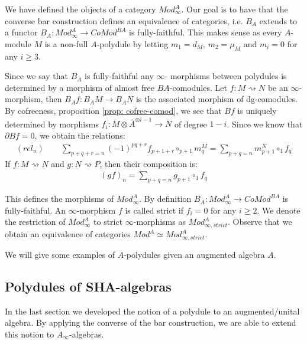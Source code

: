 \documentclass[../thesis.tex]{subfiles}
\begin{document}
            We have defined the objects of a category $Mod_\infty^A$. Our goal is to have that the converse bar construction defines an equivalence of categories, i.e. $B_A$ extends to a functor $B_A : Mod_\infty^A \rightarrow CoMod^{BA}$ is fully-faithful. This makes sense as every $A$-module $M$ is a non-full $A$-polydule by letting $m_1 = d_M$, $m_2 = \mu_M$ and $m_i = 0$ for any $i\geq 3$.

            Since we say that $B_A$ is fully-faithful any $\infty$- morphisms between polydules is determined by a morphism of almost free $BA$-comodules. Let $f : M \rightsquigarrow N$ be an $\infty$-morphism, then $B_Af : B_AM \rightarrow B_AN$ is the associated morphism of dg-comodules. By cofreeness, proposition \ref{prop: cofree-comod}, we see that $Bf$ is uniquely determined by morphisms $f_i : M \otimes \bar{A}^{\otimes i-1} \rightarrow N$ of degree $1-i$. Since we know that $\partial Bf = 0$, we obtain the relations:
            \begin{align*}
                (rel_n)\qquad \sum_{p+q+r = n} (-1)^{pq+r}f_{p+1+r} \circ_{p+1} m^M_{q} = \sum_{p+q = n} m^N_{p+1} \circ_1 f_q
            \end{align*}
            If $f : M \rightsquigarrow N$ and $g : N \rightsquigarrow P$, then their composition is:
            \begin{align*}
                (gf)_n = \sum_{p+q=n}g_{p+1}\circ_1 f_q
            \end{align*}

            This defines the morphisms of $Mod_\infty^A$. By definition $B_A: Mod_\infty^A \rightarrow CoMod^{BA}$ is fully-faithful. An $\infty$-morphism $f$ is called strict if $f_i = 0$ for any $i\geq 2$. We denote the restriction of $Mod_\infty^A$ to strict $\infty$-morphisms as $Mod_{\infty, strict}^A$. Observe that we obtain an equivalence of categories $Mod^A \simeq Mod_{\infty, strict}^A$. 
            
            We will give some examples of $A$-polydules given an augmented algebra $A$.

        \subsection{Polydules of SHA-algebras}
            In the last section we developed the notion of a polydule to an augmented/unital algebra. By applying the converse of the bar construction, we are able to extend this notion to $A_\infty$-algebras.
\end{document}
